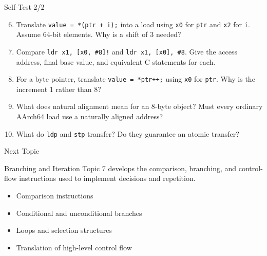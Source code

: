 \documentclass[aspectratio=169,11pt,t]{beamer}
\newcommand{\code}[1]{\texttt{#1}}
\begin{document}



\begin{frame}{Self-Test 2/2}
\begin{enumerate}
\setcounter{enumi}{5}
\item Translate \code{value = *(ptr + i);} into a load using \code{x0} for \code{ptr} and \code{x2} for \code{i}. Assume 64-bit elements. Why is a shift of 3 needed?
\item Compare \code{ldr x1, [x0, \#8]!} and \code{ldr x1, [x0], \#8}. Give the access address, final base value, and equivalent C statements for each.
\item For a byte pointer, translate \code{value = *ptr++;} using \code{x0} for \code{ptr}. Why is the increment 1 rather than 8?
\item What does natural alignment mean for an 8-byte object? Must every ordinary AArch64 load use a naturally aligned address?
\item What do \code{ldp} and \code{stp} transfer? Do they guarantee an atomic transfer?
\end{enumerate}
\end{frame}




\begin{frame}{Next Topic}
\begin{block}{Branching and Iteration}
Topic 7 develops the comparison, branching, and control-flow instructions used to implement decisions and repetition.
\end{block}
\vspace{0.25cm}
\begin{itemize}
\item Comparison instructions
\item Conditional and unconditional branches
\item Loops and selection structures
\item Translation of high-level control flow
\end{itemize}
\end{frame}
\end{document}
